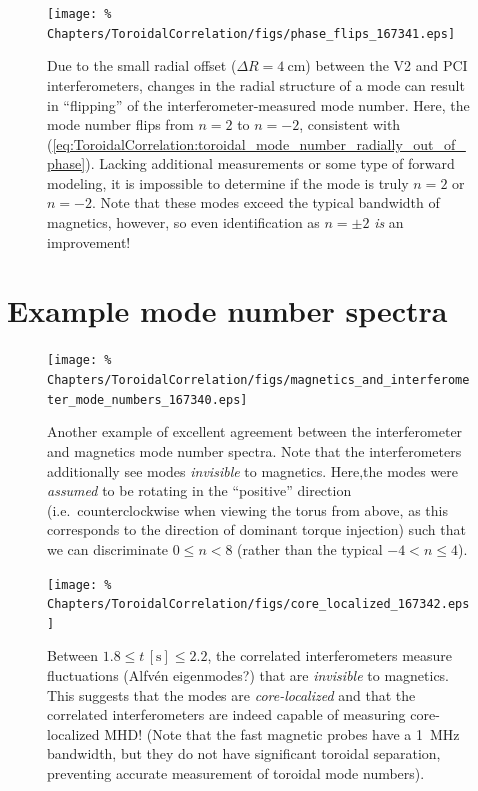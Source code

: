 \begin{figure}
  \centering
  \texttt{[image: \%
    Chapters/ToroidalCorrelation/figs/phase\_flips\_167341.eps]}
  \caption{Due to the small radial offset ($\Delta R = \SI{4}{\centi\meter}$)
    between the V2 and PCI interferometers,
    changes in the radial structure of a mode
    can result in ``flipping'' of the interferometer-measured mode number.
    Here, the mode number flips from $n = 2$ to $n = -2$,
    consistent with
    (\ref{eq:ToroidalCorrelation:toroidal_mode_number_radially_out_of_phase}).
    Lacking additional measurements or some type of forward modeling,
    it is impossible to determine if the mode is truly $n = 2$ or $n = -2$.
    Note that these modes exceed the typical bandwidth of magnetics, however,
    so even identification as $n = \pm 2$ \emph{is} an improvement!}
\label{fig:ToroidalCorrelation:mode_number_flips}
\end{figure}


\section{Example mode number spectra}

\begin{figure}[h!]
  \centering
  \texttt{[image: \%
    Chapters/ToroidalCorrelation/figs/magnetics\_and\_interferometer\_mode\_numbers\_167340.eps]}
  \caption{Another example of excellent agreement between the
    interferometer and magnetics mode number spectra. Note that
    the interferometers additionally see modes \emph{invisible} to magnetics.
    Here,the modes were \emph{assumed} to be rotating
    in the ``positive'' direction
    (i.e.\ counterclockwise when viewing the torus from above,
    as this corresponds to the direction of dominant torque injection)
    such that we can discriminate $0 \leq n < 8$
    (rather than the typical $-4 < n \leq 4$).}
\label{fig:ToroidalCorrelation:magnetics_corroboration_2}
\end{figure}

\begin{figure}[h!]
  \centering
  \texttt{[image: \%
    Chapters/ToroidalCorrelation/figs/core\_localized\_167342.eps]}
  \caption{Between $1.8 \leq t \, [\text{s}] \leq 2.2$,
    the correlated interferometers measure fluctuations
    (Alfv\'{e}n eigenmodes?) that are \emph{invisible} to magnetics.
    This suggests that the modes are \emph{core-localized} and
    that the correlated interferometers are indeed capable
    of measuring core-localized MHD!
    (Note that the fast magnetic probes have a \SI{1}{\mega\hertz} bandwidth,
    but they do not have significant toroidal separation,
    preventing accurate measurement of toroidal mode numbers).}
\label{fig:ToroidalCorrelation:core_localized}
\end{figure}

